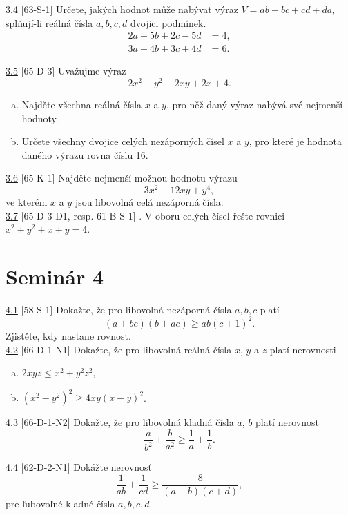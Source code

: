 \noindent \ul{3.4} [63-S-1] Určete, jakých hodnot může nabývat výraz $V = ab + bc + cd + da$, splňují-li reálná čísla $a,b, c, d$ dvojici podmínek.
\begin{align*}
2a - 5b + 2c - 5d &= 4,\\
3a + 4b + 3c + 4d &= 6.
\end{align*}
 
\noindent \ul{3.5} [65-D-3] Uvažujme výraz $$2x^2+ y^2 - 2xy + 2x + 4.$$
\begin{enumerate}[a)]

\item Najděte všechna reálná čísla $x$ a $y$, pro něž daný výraz nabývá své nejmenší hodnoty.

\item Určete všechny dvojice celých nezáporných čísel $x$ a $y$, pro které je hodnota daného výrazu rovna číslu 16.
\end{enumerate}
 
\noindent \ul{3.6} [65-K-1] Najděte nejmenší možnou hodnotu výrazu $$3x^2 - 12xy + y^4,$$ ve kterém $x$ a $y$ jsou libovolná celá nezáporná čísla.\\

 
\noindent \ul{3.7} [65-D-3-D1, resp. 61-B-S-1] . V oboru celých čísel řešte rovnici $x^2+ y^2+ x + y = 4$.\\

 
\section*{Seminár 4}

\noindent \ul{4.1} [58-S-1]
Dokažte, že pro libovolná nezáporná čísla $a, b, c$ platí $$(a + bc)(b + ac) \geq ab(c + 1)^2.$$
Zjistěte, kdy nastane rovnost. \\

 
\noindent \ul{4.2} [66-D-1-N1] Dokažte, že pro libovolná reálná čísla $x$, $y$ a $z$ platí nerovnosti
\begin{enumerate}[a)]
\item $2xyz \leq x^2+ y^2z^2$,
\item $(x^2-y^2)^2\geq 4xy(x - y)^2$.
\end{enumerate}
 
\noindent \ul{4.3} [66-D-1-N2] Dokažte, že pro libovolná kladná čísla $a$, $b$ platí nerovnost
$$\frac{a}{b^2}+ \frac{b}{a^2}\geq \frac{1}{a} + \frac{1}{b}.$$

 
\noindent \ul{4.4} [62-D-2-N1] Dokážte nerovnosť $$\frac{1}{ab}+\frac{1}{cd}\geq \frac{8}{(a+b)(c+d)},$$ pre ľubovoľné kladné čísla $a, b, c, d$.\\

